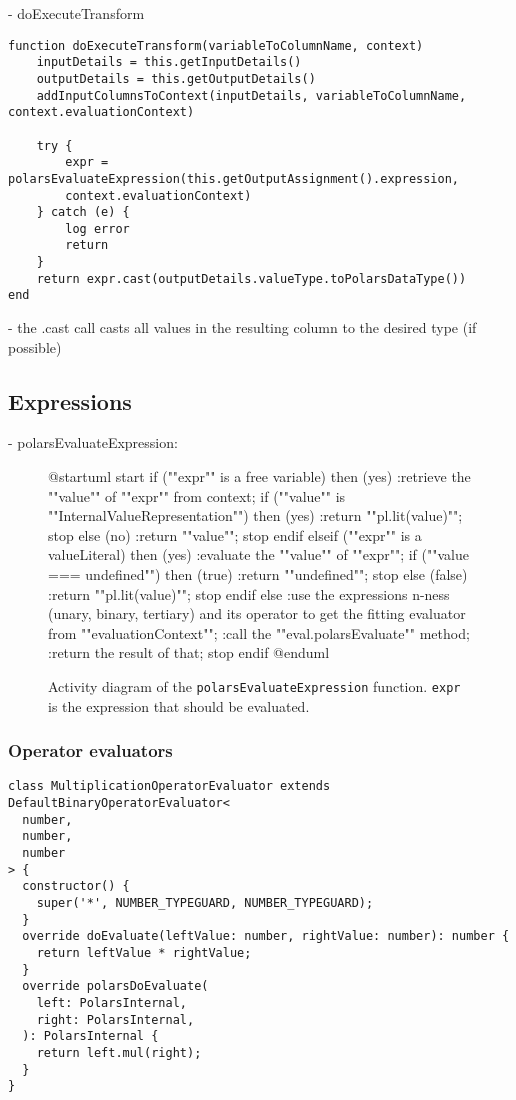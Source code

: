 - doExecuteTransform
\begin{listing}
	\begin{verbatim}
function doExecuteTransform(variableToColumnName, context)
	inputDetails = this.getInputDetails()
	outputDetails = this.getOutputDetails()
	addInputColumnsToContext(inputDetails, variableToColumnName, context.evaluationContext)

	try {
		expr = polarsEvaluateExpression(this.getOutputAssignment().expression,
		context.evaluationContext)
	} catch (e) {
		log error
		return
	}
	return expr.cast(outputDetails.valueType.toPolarsDataType())
end
	\end{verbatim}
\end{listing}
- the .cast call casts all values in the resulting column to the desired type (if possible)

\subsection{Expressions}
- polarsEvaluateExpression:
\begin{figure}
	\begin{plantuml}
		@startuml
		start
		if (""expr"" is a free variable) then (yes)
		:retrieve the ""value"" of ""expr"" from context;
		if (""value"" is ""InternalValueRepresentation"") then (yes)
		:return ""pl.lit(value)"";
		stop
		else (no)
		:return ""value"";
		stop
		endif
		elseif (""expr"" is a valueLiteral) then (yes)
		:evaluate the ""value"" of ""expr"";
		if (""value === undefined"") then (true)
		:return ""undefined"";
		stop
		else (false)
		:return ""pl.lit(value)"";
		stop
		endif
		else
		:use the expressions n-ness (unary, binary, tertiary) and its
		operator to get the fitting evaluator from ""evaluationContext"";
		:call the ""eval.polarsEvaluate"" method;
		:return the result of that;
		stop
		endif
		@enduml
	\end{plantuml}
	\caption{
		Activity diagram of the \Verb|polarsEvaluateExpression| function.
		\Verb|expr| is the expression that should be evaluated. %
	}
	\label{fig:uml:polars_evaluate_expression}
\end{figure}


\subsubsection{Operator evaluators}
\label{subsubsection:impl:operator_evaluator}
\begin{listing}
	\begin{verbatim}
class MultiplicationOperatorEvaluator extends DefaultBinaryOperatorEvaluator<
  number,
  number,
  number
> {
  constructor() {
    super('*', NUMBER_TYPEGUARD, NUMBER_TYPEGUARD);
  }
  override doEvaluate(leftValue: number, rightValue: number): number {
    return leftValue * rightValue;
  }
  override polarsDoEvaluate(
    left: PolarsInternal,
    right: PolarsInternal,
  ): PolarsInternal {
    return left.mul(right);
  }
}
	\end{verbatim}

\end{listing}





